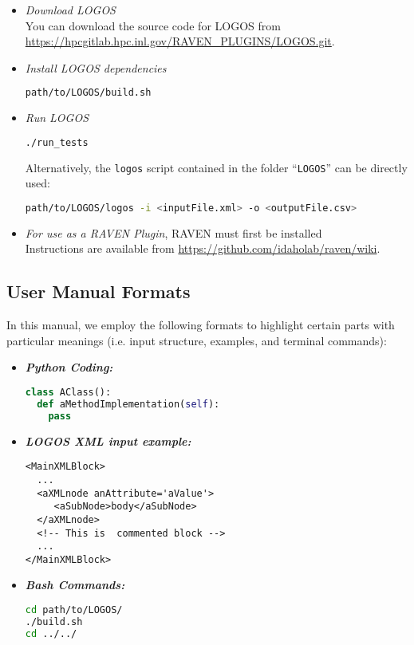 \begin{itemize}
  \item \textit{Download LOGOS}
    \\ You can download the source code for LOGOS from \url{https://hpcgitlab.hpc.inl.gov/RAVEN_PLUGINS/LOGOS.git}.
  \item \textit{Install LOGOS dependencies}
	\begin{lstlisting}[language=bash]
	path/to/LOGOS/build.sh
	\end{lstlisting}
  \item \textit{Run LOGOS}
	\begin{lstlisting}[language=bash]
	./run_tests
	\end{lstlisting}
  	Alternatively, the \texttt{logos} script
    contained in the folder ``\texttt{LOGOS}'' can be directly used:
\begin{lstlisting}[language=bash]
path/to/LOGOS/logos -i <inputFile.xml> -o <outputFile.csv>
\end{lstlisting}
	\item \textit{For use as a RAVEN Plugin}, RAVEN must first be installed
		\\ Instructions are available from \url{https://github.com/idaholab/raven/wiki}.
\end{itemize}

\subsection{User Manual Formats}
In this manual, we employ the following formats to highlight certain parts with
particular meanings (i.e. input structure, examples, and terminal commands):

\begin{itemize}
\item \textbf{\textit{Python Coding:}}
\begin{lstlisting}[language=python]
class AClass():
  def aMethodImplementation(self):
    pass
\end{lstlisting}
\item \textbf{\textit{LOGOS XML input example:}}
\begin{lstlisting}[style=XML,morekeywords={anAttribute}]
<MainXMLBlock>
  ...
  <aXMLnode anAttribute='aValue'>
     <aSubNode>body</aSubNode>
  </aXMLnode>
  <!-- This is  commented block -->
  ...
</MainXMLBlock>
\end{lstlisting}
\item \textbf{\textit{Bash Commands:}}
\begin{lstlisting}[language=bash]
cd path/to/LOGOS/
./build.sh
cd ../../
\end{lstlisting}
\end{itemize}

